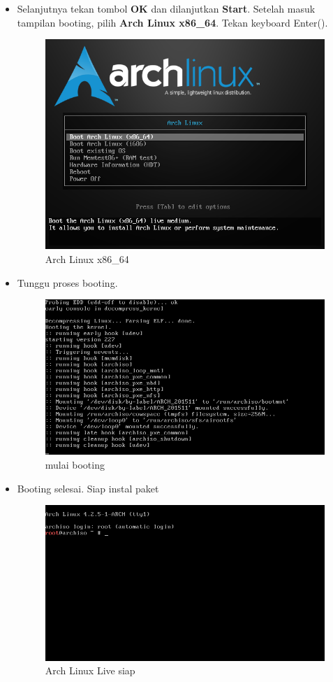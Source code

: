 \documentclass[12pt,]{article}
\begin{document}
\begin{itemize}
		\item Selanjutnya tekan tombol \textbf{OK} dan dilanjutkan \textbf{Start}.
		Setelah masuk tampilan booting, pilih \textbf{Arch Linux x86\_64}.
		Tekan keyboard Enter(\keys{\return}).
		\begin{figure}[H]
			\centering
			\includegraphics[width=0.6\linewidth]{images/vbox_linuxinstall/s1}
			\caption{Arch Linux x86\_64}
		\end{figure}
	
		\item Tunggu proses booting.
		\begin{figure}[H]
			\centering
			\includegraphics[width=0.6\linewidth]{images/vbox_linuxinstall/s2}
			\caption{mulai booting}
		\end{figure}
	
		\item Booting selesai. Siap instal paket
		\begin{figure}[H]
			\centering
			\includegraphics[width=0.6\linewidth]{images/vbox_linuxinstall/s3}
			\caption{Arch Linux Live siap}
		\end{figure}
	\end{itemize}
	
\end{document}

